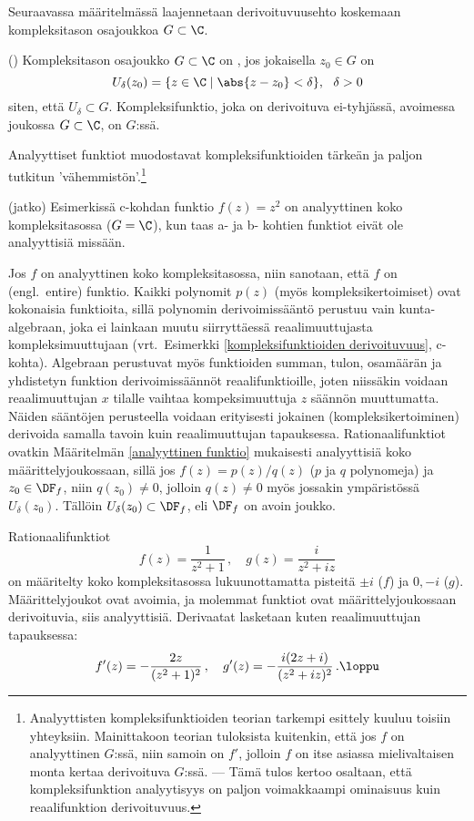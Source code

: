 Seuraavassa määritelmässä laajennetaan derivoituvuusehto koskemaan kompleksitason
 osajoukkoa $G\subset\C$.
\begin{Def} () \label{analyyttinen funktio}
 
Kompleksitason osa\-joukko $G\subset\C$ on , jos jokaisella $z_0 \in G$ on
\[ 
U_{\delta}(z_0) = \{z \in \C \mid \abs{z-z_0}<\delta\},\ \ \delta>0
\]
siten, että $U_{\delta} \subset G$. Kompleksifunktio, joka on derivoituva ei-tyhjässä,
avoimessa joukossa $G\subset\C$, on  $G$:ssä.
\end{Def}
Analyyttiset funktiot muodostavat kompleksifunktioiden tärkeän ja paljon tutkitun
'vähemmistön'.\footnote[2]{Analyyttisten kompleksifunktioiden teorian tarkempi esittely
kuuluu toisiin yhteyksiin. Mainittakoon teorian tuloksista kuitenkin, että jos $f$ on
analyyttinen $G$:ssä, niin samoin on $f'$, jolloin $f$ on itse asiassa mielivaltaisen monta
kertaa derivoituva $G$:ssä. --- Tämä tulos kertoo osaltaan, että kompleksifunktion analyytisyys
on paljon voimakkaampi ominaisuus kuin reaalifunktion derivoituvuus.}
\jatko \begin{Exa} (jatko) Esimerkissä c-kohdan funktio $f(z) = z^2$ on analyyttinen koko 
kompleksitasossa ($G = \C$), kun taas a- ja b- kohtien funktiot eivät ole analyyttisiä
missään. \loppu 
\end{Exa}
%
Jos $f$ on analyyttinen koko kompleksitasossa, niin sanotaan, että $f$ on   
(engl.\ entire) funktio. Kaikki polynomit $p(z)$ (myös kompleksikertoimiset) ovat kokonaisia 
funktioita, sillä polynomin derivoimissääntö perustuu vain kunta-algebraan, joka ei lainkaan 
muutu siirryttäessä reaalimuuttujasta kompleksimuuttujaan (vrt.\ Esimerkki 
\ref{kompleksifunktioiden derivoituvuus}, c-kohta). Algebraan perustuvat myös funktioiden
summan, tulon, osamäärän ja yhdistetyn funktion derivoimissäännöt reaalifunktioille, joten
niissäkin voidaan reaalimuuttujan $x$ tilalle vaihtaa kompeksimuuttuja $z$ säännön 
muuttumatta. Näiden sääntöjen perusteella voidaan erityisesti jokainen (kompleksikertoiminen)
 derivoida samalla tavoin kuin reaalimuuttujan 
tapauksessa. Rationaalifunktiot ovatkin Määritelmän \ref{analyyttinen funktio} mukaisesti
analyyttisiä koko määrittelyjoukossaan, sillä jos $f(z) = p(z)/q(z)$ ($p$ ja $q$ polynomeja)
ja $z_0\in\DF_f$, niin $q(z_0) \neq 0$, jolloin $q(z) \neq 0$ myös jossakin ympäristössä
$U_{\delta}(z_0)$. Tällöin $U_{\delta}(z_0)\subset\DF_f$, eli $\DF_f$ on avoin joukko.
\begin{Exa} Rationaalifunktiot
\[
f(z) = \frac{1}{z^2 + 1}\,, \quad g(z) = \frac{i}{z^2 + iz}
\]
on määritelty koko kompleksitasossa lukuunottamatta pisteitä $\pm i$ ($f$) ja $0,-i$ ($g$).
Määrittelyjoukot ovat avoimia, ja molemmat funktiot ovat määrittelyjoukossaan derivoituvia,
siis analyyttisiä. Derivaatat lasketaan kuten reaalimuuttujan tapauksessa:
\[ 
f'(z) = -\frac{2z}{(z^2 + 1)^2}\,, \quad g'(z) = -\frac{i(2z+i)}{(z^2 + iz)^2}\,. \loppu 
\] 
\end{Exa}

